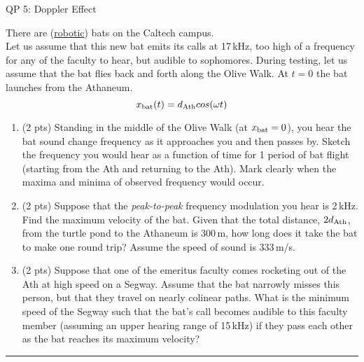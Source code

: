 \documentclass[12pt]{article}
\begin{document}
%
\begin{centering}
\LARGE{QP 5: Doppler Effect}
\end{centering}
\bigskip
\bigskip

There are
(\href{http://www.caltech.edu/news/engineers-build-robot-drone-mimics-bat-flight-53794}{robotic})
bats on the Caltech campus. \\

Let us assume that this new bat emits its calls at 17\,kHz, too high of a frequency for any of the faculty
to hear, but audible to sophomores. During testing, let us assume that the bat
flies back and forth along the Olive Walk. At $t = 0$ the bat launches from the Athaneum.
\begin{equation}
x_{\rm bat}(t) = d_{\rm Ath} cos(\omega t)
\end{equation}

\begin{enumerate}[label=(\alph*)]
\item (2 pts)
Standing in the middle of the Olive Walk (at $x_{\rm bat} = 0$),
you hear the bat sound change frequency as it approaches you and then passes by.
Sketch the frequency you would hear as a function of time for 1 period of bat flight (starting from the Ath and returning to the Ath). Mark clearly when the maxima and minima of observed frequency would occur.

\item (2 pts)
Suppose that the \emph{peak-to-peak} frequency modulation you hear is 2\,kHz. Find the
maximum velocity of the bat.  Given that the total distance, $2 d_{\rm Ath}$, from the turtle pond to the Athaneum
is 300\,m, how long does it take the bat to make one round trip? Assume the speed of sound is 333\,m/s.

\item (2 pts)
Suppose that one of the emeritus faculty comes rocketing out of the Ath at high speed on a Segway.
Assume that the bat narrowly misses this person, but that they travel on nearly colinear paths. What is the minimum speed of the Segway such that the bat's call becomes audible to this faculty member (assuming an upper hearing range of 15\,kHz) if they pass each other as the bat reaches its maximum velocity?

\end{enumerate}
\bigskip
{\color{Sepia} \hrule}



\end{document}
